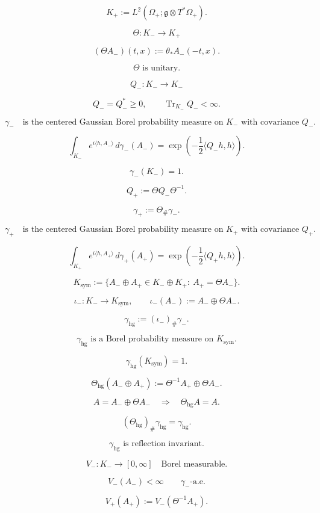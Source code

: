 \documentclass[11pt]{article}
\begin{document}
\[
K_+:=
L^2(\Omega_+;\mathfrak g\otimes T^\ast\Omega_+).
\]

\[
\Theta:K_-\to K_+
\]

\[
(\Theta A_-)(t,x)
:=
\theta_\ast A_-(-t,x).
\]

\[
\Theta
\text{ is unitary}.
\]

\[
Q_-:K_-\to K_-
\]

\[
Q_-=Q_-^\ast\ge0,
\qquad
\operatorname{Tr}_{K_-}Q_-<\infty.
\]

\[
\gamma_-
\quad
\text{is the centered Gaussian Borel probability measure on }K_-
\text{ with covariance }Q_-.
\]

\[
\int_{K_-}e^{i\langle h,A_-\rangle}\,d\gamma_-(A_-)
=
\exp\!\left(
-\frac12\langle Q_-h,h\rangle
\right).
\]

\[
\gamma_-(K_-)=1.
\]

\[
Q_+:=\Theta Q_-\Theta^{-1}.
\]

\[
\gamma_+:=\Theta_\#\gamma_-.
\]

\[
\gamma_+
\quad
\text{is the centered Gaussian Borel probability measure on }K_+
\text{ with covariance }Q_+.
\]

\[
\int_{K_+}e^{i\langle h,A_+\rangle}\,d\gamma_+(A_+)
=
\exp\!\left(
-\frac12\langle Q_+h,h\rangle
\right).
\]

\[
K_{\mathrm{sym}}
:=
\{A_-\oplus A_+\in K_-\oplus K_+:\ A_+=\Theta A_-\}.
\]

\[
\iota_-:K_-\to K_{\mathrm{sym}},
\qquad
\iota_-(A_-):=A_-\oplus \Theta A_-.
\]

\[
\gamma_{\mathrm{hg}}
:=
(\iota_-)_\#\gamma_-.
\]

\[
\gamma_{\mathrm{hg}}
\text{ is a Borel probability measure on }K_{\mathrm{sym}}.
\]

\[
\gamma_{\mathrm{hg}}(K_{\mathrm{sym}})=1.
\]

\[
\Theta_{\mathrm{hg}}(A_-\oplus A_+)
:=
\Theta^{-1}A_+\oplus\Theta A_-.
\]

\[
A=A_-\oplus\Theta A_-
\quad\Longrightarrow\quad
\Theta_{\mathrm{hg}}A=A.
\]

\[
(\Theta_{\mathrm{hg}})_\#\gamma_{\mathrm{hg}}
=
\gamma_{\mathrm{hg}}.
\]

\[
\boxed{
\gamma_{\mathrm{hg}}
\text{ is reflection invariant.}
}
\]

\[
V_-:K_-\to[0,\infty]
\quad
\text{Borel measurable}.
\]

\[
V_-(A_-)<\infty
\qquad
\gamma_-\text{-a.e.}
\]

\[
V_+(A_+):=V_-(\Theta^{-1}A_+).
\]
\end{document}
